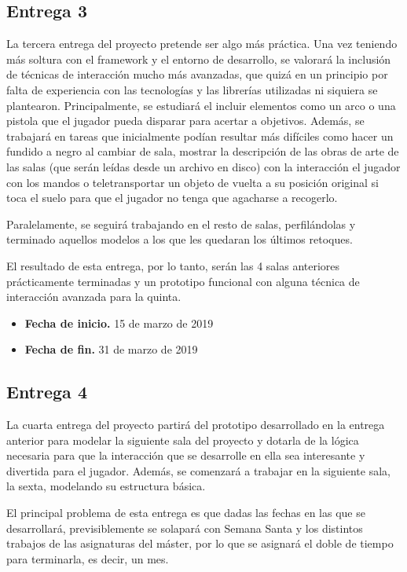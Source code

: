 \subsection{Entrega 3}

La tercera entrega del proyecto pretende ser algo más práctica. Una vez teniendo más soltura con el framework y el entorno de desarrollo, se valorará la inclusión de técnicas de interacción mucho más avanzadas, que quizá en un principio por falta de experiencia con las tecnologías y las librerías utilizadas ni siquiera se plantearon. Principalmente, se estudiará el incluir elementos como un arco o una pistola que el jugador pueda disparar para acertar a objetivos. Además, se trabajará en tareas que inicialmente podían resultar más difíciles como hacer un fundido a negro al cambiar de sala, mostrar la descripción de las obras de arte de las salas (que serán leídas desde un archivo en disco) con la interacción el jugador con los mandos o teletransportar un objeto de vuelta a su posición original si toca el suelo para que el jugador no tenga que agacharse a recogerlo.

Paralelamente, se seguirá trabajando en el resto de salas, perfilándolas y terminado aquellos modelos a los que les quedaran los últimos retoques.

El resultado de esta entrega, por lo tanto, serán las 4 salas anteriores prácticamente terminadas y un prototipo funcional con alguna técnica de interacción avanzada para la quinta.

\begin{itemize}
    \item \textbf{Fecha de inicio.} 15 de marzo de 2019
    \item \textbf{Fecha de fin.} 31 de marzo de 2019
\end{itemize}

\subsection{Entrega 4}

La cuarta entrega del proyecto partirá del prototipo desarrollado en la entrega anterior para modelar la siguiente sala del proyecto y dotarla de la lógica necesaria para que la interacción que se desarrolle en ella sea interesante y divertida para el jugador. Además, se comenzará a trabajar en la siguiente sala, la sexta, modelando su estructura básica.

El principal problema de esta entrega es que dadas las fechas en las que se desarrollará, previsiblemente se solapará con Semana Santa y los distintos trabajos de las asignaturas del máster, por lo que se asignará el doble de tiempo para terminarla, es decir, un mes.

